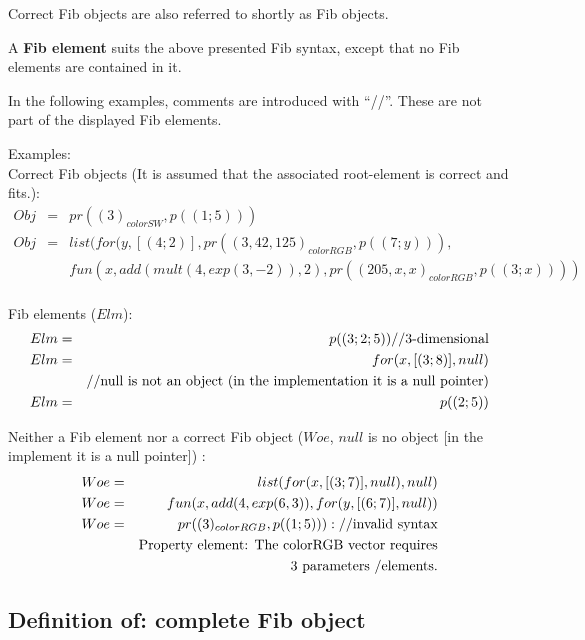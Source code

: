 Correct Fib objects are also referred to shortly as Fib objects.

\bigskip\noindent
A \textbf{Fib element} suits the above presented Fib syntax, except that no Fib elements are contained in it.

\bigskip\noindent
In the following examples, comments are introduced with ``//''. These are not part of the displayed Fib elements.

\begin{flushleft}
Examples:\\
Correct Fib objects (It is assumed that the associated root-element is correct and fits.):
\begin{eqnarray*}
Obj &=& pr( (3)_{colorSW}, p((1;5)))\\
Obj &=& list( for(y,[(4;2)], pr( (3, 42, 125)_{colorRGB} , p((7;y))), \\
&& fun(x,add( mult(4, exp( 3, -2)), 2 ), pr( (205, x ,x)_{colorRGB}, p((3;x)) ) )\\
\end{eqnarray*}

Fib elements ($Elm$):
\begin{eqnarray*}
Elm &=& p((3;2;5)) \textnormal{//3-dimensional}\\
Elm &=& for(x,[(3;8)],null) \\
& & \textnormal{//null is not an object (in the implementation it is a null pointer)}\\
Elm &=& p((2;5))\\
\end{eqnarray*}

Neither a Fib element nor a correct Fib object ($Woe$, $null$ is no object [in the implement it is a null pointer]) :\\
\begin{eqnarray*}
Woe &=& list( for( x, [(3;7)], null), null)\\
Woe &=& fun( x, add(4, exp(6, 3) ) , for(y, [(6;7)], null))\\
Woe &=& pr( (3)_{colorRGB}, p((1;5)) ): \textnormal{//invalid syntax} \\
&& \textnormal{Property element: The colorRGB vector requires}\\
&& \textnormal{3 parameters /elements.}\\
\end{eqnarray*}

\end{flushleft}


\subsection{Definition of: complete Fib object}
\label{secFullFibObject}

